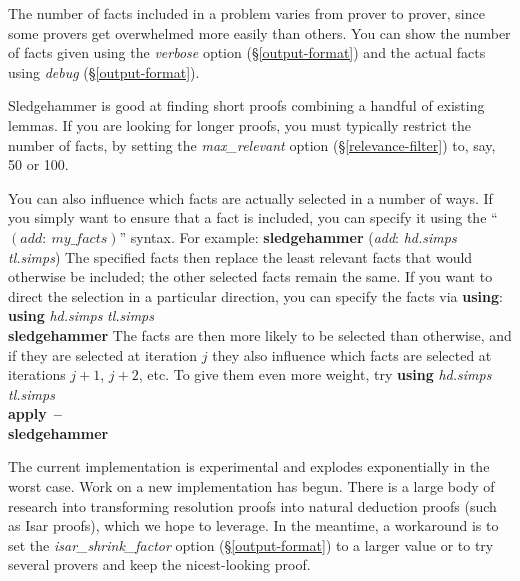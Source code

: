 \documentclass[a4paper,12pt]{article}
\begin{document}
The number of facts included in a problem varies from prover to prover, since
some provers get overwhelmed more easily than others. You can show the number of
facts given using the \textit{verbose} option (\S\ref{output-format}) and the
actual facts using \textit{debug} (\S\ref{output-format}).

Sledgehammer is good at finding short proofs combining a handful of existing
lemmas. If you are looking for longer proofs, you must typically restrict the
number of facts, by setting the \textit{max\_relevant} option
(\S\ref{relevance-filter}) to, say, 50 or 100.

You can also influence which facts are actually selected in a number of ways. If
you simply want to ensure that a fact is included, you can specify it using the
``$(\textit{add}{:}~\textit{my\_facts})$'' syntax. For example:
%
\prew
\textbf{sledgehammer} (\textit{add}: \textit{hd.simps} \textit{tl.simps})
\postw
%
The specified facts then replace the least relevant facts that would otherwise be
included; the other selected facts remain the same.
If you want to direct the selection in a particular direction, you can specify
the facts via \textbf{using}:
%
\prew
\textbf{using} \textit{hd.simps} \textit{tl.simps} \\
\textbf{sledgehammer}
\postw
%
The facts are then more likely to be selected than otherwise, and if they are
selected at iteration $j$ they also influence which facts are selected at
iterations $j + 1$, $j + 2$, etc. To give them even more weight, try
%
\prew
\textbf{using} \textit{hd.simps} \textit{tl.simps} \\
\textbf{apply}~\textbf{--} \\
\textbf{sledgehammer}
\postw


The current implementation is experimental and explodes exponentially in the
worst case. Work on a new implementation has begun. There is a large body of
research into transforming resolution proofs into natural deduction proofs (such
as Isar proofs), which we hope to leverage. In the meantime, a workaround is to
set the \textit{isar\_shrink\_factor} option (\S\ref{output-format}) to a larger
value or to try several provers and keep the nicest-looking proof.

\end{document}
